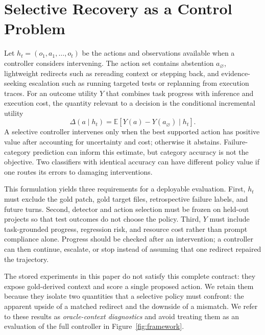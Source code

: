 \documentclass{article}
\begin{document}
\section{Selective Recovery as a Control Problem}
\label{sec:formulation}

Let $h_t=(o_1,a_1,\ldots,o_t)$ be the actions and observations available when a
controller considers intervening.  The action set contains abstention
$a_\varnothing$, lightweight redirects such as rereading context or stepping
back, and evidence-seeking escalation such as running targeted tests or
replanning from execution traces.  For an outcome utility $Y$ that combines
task progress with inference and execution cost, the quantity relevant to a
decision is the conditional incremental utility
\begin{equation}
  \Delta(a\mid h_t)
  = \mathbb{E}\!\left[Y(a)-Y(a_\varnothing)\mid h_t\right].
  \label{eq:intervention-utility}
\end{equation}
A selective controller intervenes only when the best supported action has
positive value after accounting for uncertainty and cost; otherwise it
abstains.  Failure-category prediction can inform this estimate, but category
accuracy is not the objective.  Two classifiers with identical accuracy can
have different policy value if one routes its errors to damaging interventions.

This formulation yields three requirements for a deployable evaluation.
First, $h_t$ must exclude the gold patch, gold target files, retrospective
failure labels, and future turns.  Second, detector and action selection must
be frozen on held-out projects so that test outcomes do not choose the policy.
Third, $Y$ must include task-grounded progress, regression risk, and resource
cost rather than prompt compliance alone.  Progress should be checked after an
intervention; a controller can then continue, escalate, or stop instead of
assuming that one redirect repaired the trajectory.

The stored experiments in this paper do not satisfy this complete contract:
they expose gold-derived context and score a single proposed action.  We retain
them because they isolate two quantities that a selective policy must confront:
the apparent upside of a matched redirect and the downside of a mismatch.  We
refer to these results as \emph{oracle-context diagnostics} and avoid treating
them as an evaluation of the full controller in Figure~\ref{fig:framework}.
\end{document}
